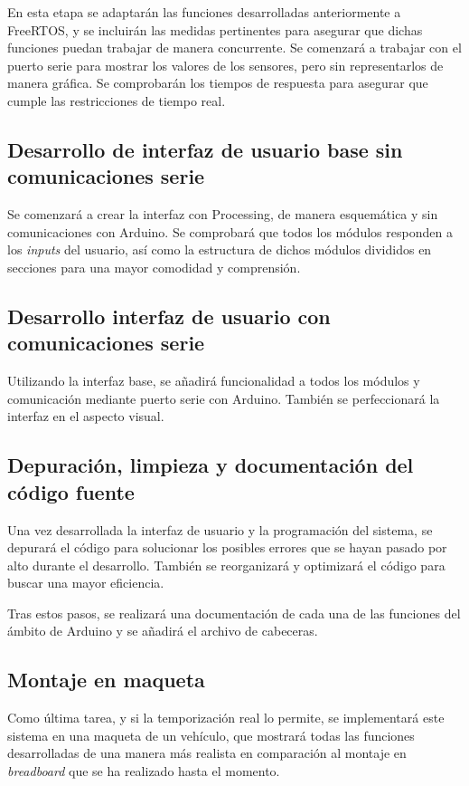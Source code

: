 En esta etapa se adaptarán las funciones desarrolladas anteriormente a FreeRTOS, y se incluirán las medidas pertinentes para asegurar que dichas funciones puedan trabajar de manera concurrente. Se comenzará a trabajar con el puerto serie para mostrar los valores de los sensores, pero sin representarlos de manera gráfica. Se comprobarán los tiempos de respuesta para asegurar que cumple las restricciones de tiempo real. 

\subsection{Desarrollo de interfaz de usuario base sin comunicaciones serie}

Se comenzará a crear la interfaz con Processing, de manera esquemática y sin comunicaciones con Arduino. Se comprobará que todos los módulos responden a los \textit{inputs} del usuario, así como la estructura de dichos módulos divididos en secciones para una mayor comodidad y comprensión.

\subsection{Desarrollo interfaz de usuario con comunicaciones serie}

Utilizando la interfaz base, se añadirá funcionalidad a todos los módulos y comunicación mediante puerto serie con Arduino. También se perfeccionará la interfaz en el aspecto visual. 

\subsection{Depuración, limpieza y documentación del código fuente}

Una vez desarrollada la interfaz de usuario y la programación del sistema, se depurará el código para solucionar los posibles errores que se hayan pasado por alto durante el desarrollo. También se reorganizará y optimizará el código para buscar una mayor eficiencia. 

Tras estos pasos, se realizará una documentación de cada una de las funciones del ámbito de Arduino y se añadirá el archivo de cabeceras. 

\subsection{Montaje en maqueta } 

Como última tarea, y si la temporización real lo permite, se implementará este sistema en una maqueta de un vehículo, que mostrará todas las funciones desarrolladas de una manera más realista en comparación al montaje en \textit{breadboard} que se ha realizado hasta el momento. 


